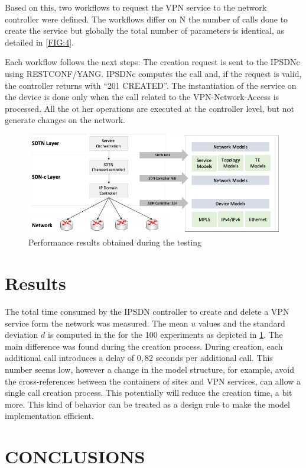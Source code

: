 \documentclass[conference]{IEEEtran}
\begin{document}
Based on this, two workflows to request the VPN service to the network controller were defined. The workflows differ on N the number of calls done to create the service but globally the total number of parameters is identical, as detailed in \cref{FIG:4}.

Each workflow follows the next steps:  The creation request is sent to the IPSDNc using RESTCONF/YANG. IPSDNc computes the call and, if the request is valid, the controller returns with “201 CREATED”. The instantiation of the service on the device is done only when the call related to the VPN-Network-Access is processed. All the ot her operations are executed at the controller level, but not generate changes on the network. 

\begin{figure}
	\centering
		\includegraphics[scale=0.9]{fig1_architecture.png}
	\caption{Performance results obtained during the testing}
	\label{FIG:5}
\end{figure}

\section{Results}
The total time consumed by the IPSDN controller to create and delete a VPN service form the network was measured. The mean $u$ values and the standard deviation $d$ is computed in the for the 100 experiments as depicted in \cref{FIG:5}. The main difference was found during the creation process. During creation, each additional call introduces a delay of $0,82$ seconds per additional call. This number seems low, however a change in the model structure, for example, avoid the cross-references between the containers of sites and VPN services, can allow a single call creation process. This potentially will reduce the creation time, a bit more. This kind of behavior can be treated as a design rule to make the model implementation efficient. 

\section{CONCLUSIONS}
\end{document}
